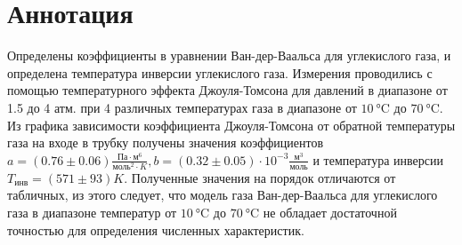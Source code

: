 \section*{Аннотация}
Определены коэффициенты в уравнении Ван-дер-Ваальса для углекислого газа, и определена температура инверсии углекислого газа. 
Измерения проводились с помощью температурного эффекта Джоуля-Томсона для давлений в диапазоне от 1.5 до 4 атм. при 4 различных температурах газа в диапазоне от $\SI{10}{\celsius}$ до $\SI{70}{\celsius}$. Из графика зависимости коэффициента Джоуля-Томсона от обратной температуры газа на входе в трубку получены значения коэффициентов $a = (0.76 \pm 0.06) \frac{\text{Па}\cdot \text{м}^6}{\text{моль}^2\cdot K}, b = (0.32 \pm 0.05)\cdot 10^{-3} \frac{\text{м}^3}{\text{моль}}$ и температура инверсии $T_\text{инв} = (571 \pm 93)K$. Полученные значения на порядок отличаются от табличных, из этого следует, что модель газа Ван-дер-Ваальса для углекислого газа в диапазоне температур от $\SI{10}{\celsius}$ до $\SI{70}{\celsius}$ не обладает достаточной точностью для определения численных характеристик.